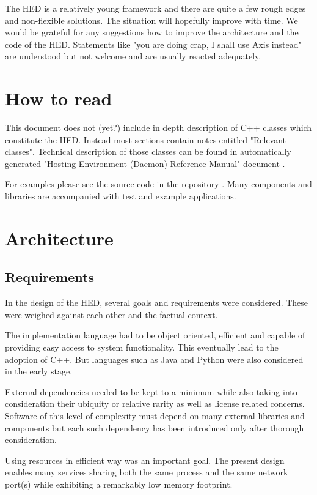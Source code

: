 \documentclass{book}
\begin{document}
The HED is a relatively young framework and there are quite a few rough edges and non-flexible solutions. The situation will hopefully improve with time. We would be grateful for any suggestions how to improve the architecture and the code of the HED. Statements like "you are doing crap, I shall use Axis instead" are understood but not welcome and are usually reacted adequately.

\chapter{How to read}

This document does not (yet?) include in depth description of C++ classes which constitute the HED. Instead most sections contain notes entitled "Relevant classes". Technical description of those classes can be found in automatically generated "Hosting Environment (Daemon) Reference Manual" document \cite{hed-api}.

For examples please see the source code in the repository \cite{svn-arc1}. Many components and libraries are accompanied with test and example applications.


\chapter{Architecture}

\section{Requirements}
In the design of the HED, several goals and requirements were considered. These were weighed against each other and the factual context.

The implementation language had to be object oriented, efficient and capable of providing easy access to system functionality. This eventually lead to the adoption of C++. But languages such as Java and Python were also considered in the early stage.

External dependencies needed to be kept to a minimum while also taking into consideration their ubiquity or relative rarity as well as license related concerns. Software of this level of complexity must depend on many external libraries and components but each such dependency has been introduced only after thorough consideration.

Using resources in efficient way was an important goal. The present design enables many services sharing both the same process and the same network port(s) while exhibiting a remarkably low memory footprint.
\end{document}
